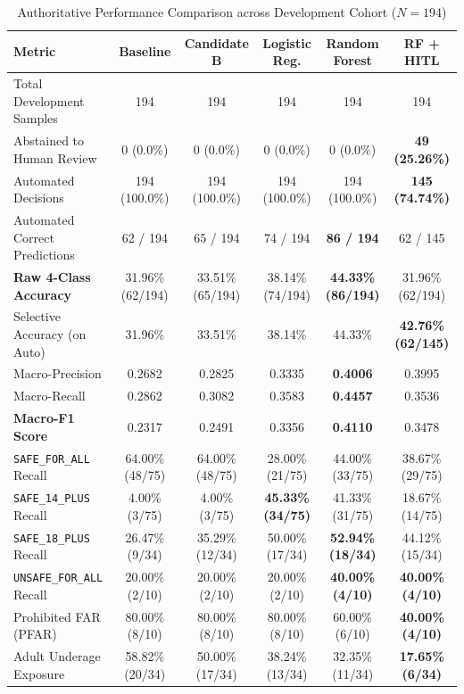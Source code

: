 \documentclass[12pt,a4paper]{report}
\begin{document}
\begin{table}[htbp]
\centering
\small
\caption{Authoritative Performance Comparison across Development Cohort ($N=194$)}
\label{tab:p8_full_benchmark}
\setlength{\tabcolsep}{2.5pt}
\renewcommand{\arraystretch}{1.2}
\begin{tabular}{|l|c|c|c|c|c|}
\hline
\textbf{Metric} & \textbf{Baseline} & \textbf{Candidate B} & \textbf{Logistic Reg.} & \textbf{Random Forest} & \textbf{RF + HITL} \\
\hline
Total Development Samples & 194 & 194 & 194 & 194 & 194 \\
Abstained to Human Review & 0 (0.0\%) & 0 (0.0\%) & 0 (0.0\%) & 0 (0.0\%) & \textbf{49 (25.26\%)} \\
Automated Decisions & 194 (100.0\%) & 194 (100.0\%) & 194 (100.0\%) & 194 (100.0\%) & \textbf{145 (74.74\%)} \\
Automated Correct Predictions & 62 / 194 & 65 / 194 & 74 / 194 & \textbf{86 / 194} & 62 / 145 \\
\textbf{Raw 4-Class Accuracy} & 31.96\% (62/194) & 33.51\% (65/194) & 38.14\% (74/194) & \textbf{44.33\% (86/194)} & 31.96\% (62/194) \\
Selective Accuracy (on Auto) & 31.96\% & 33.51\% & 38.14\% & 44.33\% & \textbf{42.76\% (62/145)} \\
Macro-Precision & 0.2682 & 0.2825 & 0.3335 & \textbf{0.4006} & 0.3995 \\
Macro-Recall & 0.2862 & 0.3082 & 0.3583 & \textbf{0.4457} & 0.3536 \\
\textbf{Macro-F1 Score} & 0.2317 & 0.2491 & 0.3356 & \textbf{0.4110} & 0.3478 \\
\texttt{SAFE\_FOR\_ALL} Recall & 64.00\% (48/75) & 64.00\% (48/75) & 28.00\% (21/75) & 44.00\% (33/75) & 38.67\% (29/75) \\
\texttt{SAFE\_14\_PLUS} Recall & 4.00\% (3/75) & 4.00\% (3/75) & \textbf{45.33\% (34/75)} & 41.33\% (31/75) & 18.67\% (14/75) \\
\texttt{SAFE\_18\_PLUS} Recall & 26.47\% (9/34) & 35.29\% (12/34) & 50.00\% (17/34) & \textbf{52.94\% (18/34)} & 44.12\% (15/34) \\
\texttt{UNSAFE\_FOR\_ALL} Recall & 20.00\% (2/10) & 20.00\% (2/10) & 20.00\% (2/10) & \textbf{40.00\% (4/10)} & \textbf{40.00\% (4/10)} \\
Prohibited FAR (PFAR) & 80.00\% (8/10) & 80.00\% (8/10) & 80.00\% (8/10) & 60.00\% (6/10) & \textbf{40.00\% (4/10)} \\
Adult Underage Exposure & 58.82\% (20/34) & 50.00\% (17/34) & 38.24\% (13/34) & 32.35\% (11/34) & \textbf{17.65\% (6/34)} \\
\hline
\end{tabular}
\end{table}
\end{document}
